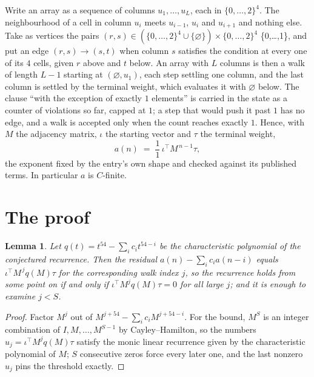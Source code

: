 \documentclass[11pt,a4paper]{article}
\theoremstyle{plain}
\newtheorem{lemma}[theorem]{Lemma}
\theoremstyle{definition}
\begin{document}
Write an array as a sequence of columns $u_1,\dots,u_L$, each in
$\{0,\dots,2\}^{4}$. The neighbourhood of a cell in column $u_i$ meets $u_{i-1}$,
$u_i$ and $u_{i+1}$ and nothing else. Take as vertices the pairs
$(r,s)\in(\{0,\dots,2\}^{4}\cup\{\varnothing\})\times\{0,\dots,2\}^{4}$ \times \{0,\dots,1\},
and put an edge $(r,s)\to(s,t)$ when column $s$ satisfies the condition at every one of its
$4$ cells, given $r$ above and $t$ below. An array with $L$ columns is then a walk of length
$L-1$ starting at $(\varnothing,u_1)$, each step settling one column, and the last column is
settled by the terminal weight, which evaluates it with $\varnothing$ below. The clause ``with the exception of exactly $1$ elements'' is carried in
the state as a counter of violations so far, capped at $1$; a step that would push it past
$1$ has no edge, and a walk is accepted only when the count reaches exactly $1$. Hence,
with $M$ the adjacency matrix, $\iota$ the starting vector and $\tau$ the terminal weight,
\[
a(n)\;=\;\frac{1}{1}\,\iota^{\!\top}M^{\,n-1}\tau ,
\]
the exponent fixed by the entry's own shape and checked against its published terms. In
particular $a$ is $C$-finite.

\section{The proof}

\begin{lemma}\label{lem:crit}
Let $q(t)=t^{54}-\sum_i c_it^{54-i}$ be the characteristic polynomial of the
conjectured recurrence. Then the residual $a(n)-\sum_ic_ia(n-i)$ equals
$\iota^{\!\top}M^{\,j}q(M)\tau$ for the corresponding walk index $j$, so the
recurrence holds from some point on if and only if $\iota^{\!\top}M^{j}q(M)\tau=0$ for all
large $j$; and it is enough to examine $j<S$.
\end{lemma}

\begin{proof}
Factor $M^{j}$ out of $M^{j+54}-\sum_ic_iM^{j+54-i}$. For the bound, $M^{S}$
is an integer combination of $I,M,\dots,M^{S-1}$ by Cayley--Hamilton, so the numbers
$u_j=\iota^{\!\top}M^{j}q(M)\tau$ satisfy the monic linear recurrence given by the
characteristic polynomial of $M$; $S$ consecutive zeros force every later one, and the last
nonzero $u_j$ pins the threshold exactly.
\end{proof}
\end{document}
